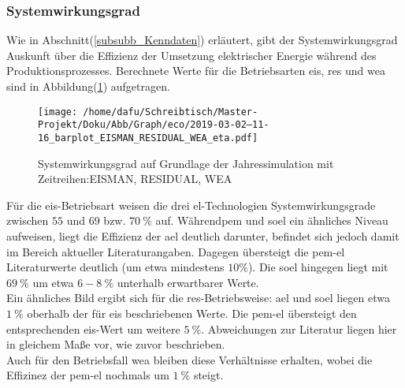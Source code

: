 \documentclass[onecolumn,10pt,titlepage]{article}
\begin{document}
\subsubsection{Systemwirkungsgrad}
Wie in Abschnitt(\ref{subsubb_Kenndaten}) erläutert, gibt der Systemwirkungsgrad Auskunft über die Effizienz der Umsetzung elektrischer Energie während des Produktionsprozesses. Berechnete Werte für die Betriebsarten \gls{eis}, \gls{res} und \gls{wea} sind in Abbildung(\ref{fig:analy_nC_eta}) aufgetragen.
\begin{figure}[H]
	
	\centering
	\texttt{[image: /home/dafu/Schreibtisch/Master-Projekt/Doku/Abb/Graph/eco/2019-03-02--11-16\_barplot\_EISMAN\_RESIDUAL\_WEA\_eta.pdf]}
	\caption[Systemwirkungsgrad EIS, RES, WEA]{Systemwirkungsgrad auf Grundlage der Jahressimulation mit Zeitreihen:EISMAN, RESIDUAL, WEA }
	\label{fig:analy_nC_eta} 
\end{figure}
Für die \gls{eis}-Betriebsart weisen die drei \gls{el}-Technologien Systemwirkungsgrade zwischen $55 $ und $69$ bzw. $70~\%$ auf. Während\gls{pem} und \gls{soel} ein ähnliches Niveau aufweisen, liegt die Effizienz der \gls{ael} deutlich darunter, befindet sich jedoch damit im Bereich aktueller Literaturangaben.\cite{Buttler.2018}
Dagegen übersteigt die \gls{pem}-\gls{el} Literaturwerte deutlich (um etwa mindestens $10\%$). Die \gls{soel} hingegen liegt mit $69~\%$ um etwa $6-8~\%$ unterhalb erwartbarer Werte.\\
Ein ähnliches Bild ergibt sich für die \gls{res}-Betriebsweise: \gls{ael} und \gls{soel} liegen etwa $1~\%$ oberhalb der für \gls{eis} beschriebenen Werte. Die \gls{pem}-\gls{el} übersteigt den entsprechenden \gls{eis}-Wert um weitere $5~\%$. Abweichungen zur Literatur liegen hier in gleichem Maße vor, wie zuvor beschrieben.\\
Auch für den Betriebsfall \gls{wea} bleiben diese Verhältnisse erhalten, wobei die Effizinez der \gls{pem}-\gls{el} nochmals um $1~ \%$ steigt.\\
\end{document}
